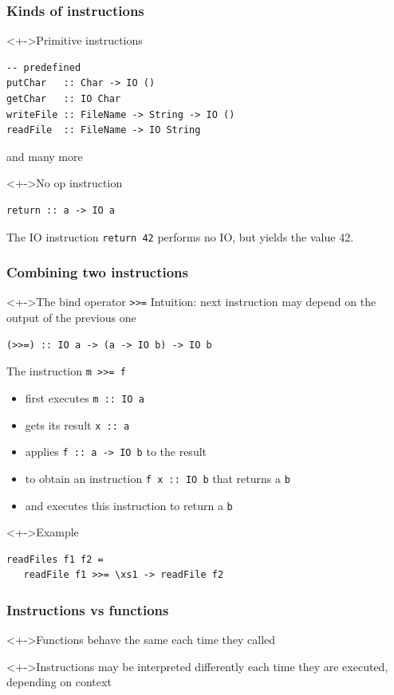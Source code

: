 \documentclass{beamer}
\begin{document}
\begin{frame}[fragile]
  \frametitle{Kinds of instructions}
  \begin{block}<+->{Primitive instructions}
\begin{lstlisting}
-- predefined
putChar   :: Char -> IO ()
getChar   :: IO Char
writeFile :: FileName -> String -> IO ()
readFile  :: FileName -> IO String
\end{lstlisting}
and many more
  \end{block}
  \begin{block}<+->{No op instruction}
\begin{lstlisting}
return :: a -> IO a
\end{lstlisting}
    The IO instruction \lstinline{return 42} performs no IO, but yields the value 42.
  \end{block}
\end{frame}
\begin{frame}[fragile]
  \frametitle{Combining two instructions}
  \begin{block}<+->{The bind operator \texttt{>>=}}
    Intuition:  next instruction may depend on the output of the previous one
\begin{verbatim}
(>>=) :: IO a -> (a -> IO b) -> IO b
\end{verbatim}
    The instruction \texttt{m >>= f}
    \begin{itemize}
    \item first executes \texttt{m :: IO a} 
    \item gets its result \texttt{x :: a}
    \item applies \texttt{f :: a -> IO b} to the result
    \item to obtain an instruction \texttt{f x :: IO b} that returns a \texttt{b}
    \item and executes this instruction to return a \texttt{b}
    \end{itemize}
  \end{block}
  \begin{block}<+->{Example}
\begin{lstlisting}
readFiles f1 f2 =
   readFile f1 >>= \xs1 -> readFile f2 
\end{lstlisting}
  \end{block}
\end{frame}
\begin{frame}[fragile]
  \frametitle{Instructions vs functions}
  \begin{block}<+->{Functions}
    behave the same each time they called
  \end{block}
  \begin{block}<+->{Instructions}
    may be interpreted differently each time 
    they are executed, depending on context    
  \end{block}
\end{frame}
\end{document}
